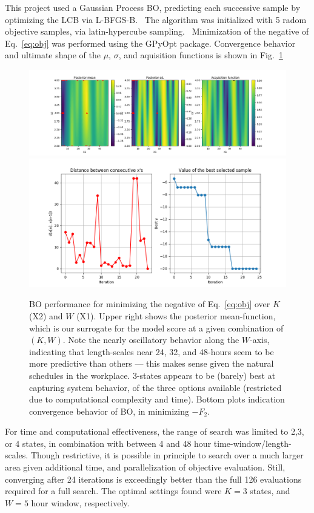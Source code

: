 \documentclass[twocolumn,10pt]{article}
\begin{document}
This project used a Gaussian Process BO, predicting each successive sample by optimizing the LCB via L-BFGS-B.~\cite{zhu1997algorithm} The algorithm was initialized with 5 radom objective samples, via latin-hypercube sampling.~\cite{eglajs1977new} Minimization of the negative of Eq.~\ref{eq:obj} was performed using the GPyOpt package\cite{gpyopt2016}. Convergence behavior and ultimate shape of the $\mu$, $\sigma$, and aquisition functions is shown in Fig.~\ref{fig:BO}


\begin{figure}
    \centering
    \includegraphics[width=\linewidth]{img/acq.png}
    \includegraphics[width=.7\linewidth]{conv}
    \caption{BO performance for minimizing the negative of Eq.~\ref{eq:obj} over $K$ (X2) and $W$ (X1). Upper right shows the posterior mean-function, which is our surrogate for the model score at a given combination of $(K,W)$. Note the nearly oscillatory behavior along the $W$-axis, indicating that length-scales near 24, 32, and 48-hours seem to be more predictive than others --- this makes sense given the natural schedules in the workplace. 3-states appears to be (barely) best at capturing system behavior, of the three options available (restricted due to computational complexity and time). Bottom plots indication convergence behavior of BO, in minimizing $-F_2$. }
    \label{fig:BO}
\end{figure}

For time and computational effectiveness, the range of search was limited to 2,3, or 4 states, in combination with between 4 and 48 hour time-window/length-scales. Though restrictive, it is possible in principle to search over a much larger area given additional time, and parallelization of objective evaluation. Still, converging after 24 iterations is exceedingly better than the full 126 evaluations required for a full search. The optimal settings found were $K=3$ states, and $W=5$ hour window, respectively.
\end{document}
